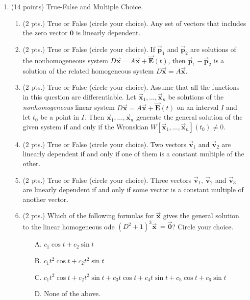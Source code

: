 \documentclass[12pt]{article}
\def\vp{\vec {\mathbf{p}}}
\def\vE{\vec {\mathbf{E}}}
\def\vx{\vec {\mathbf{x}}}
\def\v0{\vec {\mathbf{0}}}
\newcommand{\bv}{\vec{\mathbf{v}}}
\begin{document}
\begin{enumerate}
   

\item (14 points) True-False and Multiple Choice.
  \begin{enumerate}
    \setlength{\itemsep}{20mm}
    
    \item (2 pts.) True or False (circle your choice).  Any set of vectors that includes the zero
      vector $\mathbf{0}$ is linearly dependent.
      
     

\item (2 pts.) True or False (circle your choice).  If $\vp_1$ and $\vp_2$ are solutions of the nonhomogeneous
  system $D\vx = A\vx + \vE(t)$, then $\vp_1 - \vp_2$ is a solution of
  the related homogeneous system $D\vx = A\vx$.
  
 

  \item (2 pts.) True or False (circle your choice).  Assume that all the functions in this question are differentiable.  Let $\vx_1, \ldots, \vx_n$ be solutions of the \emph{nonhomogeneous}
  linear system $D\vx = A\vx + \vE(t)$ on an interval $I$ and let
  $t_0$ be a point in $I$.
  Then $\vx_1, \ldots, \vx_n$ generate the general solution of the given
  system if and only if the Wronskian $W[\vx_1, \ldots, \vx_n](t_0)
  \ne 0$.
  


  \item (2 pts.) True or False (circle your choice). Two vectors $\bv_1$ and $\bv_2$ are linearly dependent if and
  only if one of them is a constant multiple of the other. 


\item (2 pts.) True or False (circle your choice).  Three vectors $\bv_1$, $\bv_2$ and
  $\bv_3$ are linearly dependent if and only if some vector is a constant multiple of another vector.


\item  (2 pts.)  Which of the following formulas for $\vx$ gives the
  general solution to the linear homogeneous ode $(D^2+1)^3\vx\ =\v0$?
  Circle your choice.
    \begin{enumerate}
\item[A.] $c_1 \cos t +c_2 \sin t$
\item[B.] $c_1t^2 \cos t +c_2t^2 \sin t$
\item[C.] $c_1t^2 \cos t +c_2t^2 \sin t +c_3t \cos t +c_4t \sin t +c_5
  \cos t +c_6 \sin t$
\item[D.] None of the above.
\end{enumerate}



\end{enumerate}
\end{enumerate}
\end{document}
